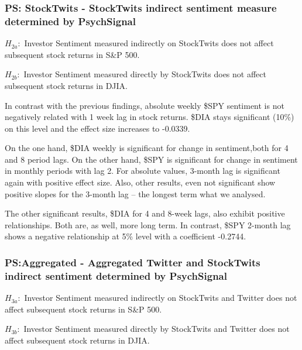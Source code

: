 

\subsubsection{PS: StockTwits - StockTwits indirect sentiment measure determined by PsychSignal}

\begin{center}

\itshape{
$H_{2a}:$ Investor Sentiment measured indirectly on StockTwits does not affect subsequent stock returns in S\&P 500.

$H_{2b}:$ Investor Sentiment measured directly by StockTwits does not affect subsequent stock returns in DJIA.
}

\end{center}

In contrast with the previous findings, absolute weekly \$SPY sentiment is not negatively related with 1 week lag in stock returns. \$DIA stays significant (10\%) on this level and the effect size increases to -0.0339.
\par
On the one hand, \$DIA weekly is significant for change in sentiment,both for 4 and 8 period lags. On the other hand, \$SPY is significant for change in sentiment in monthly periods with lag 2. For absolute values, 3-month lag is significant again with positive effect size. Also, other results, even not significant show positive slopes for the 3-month lag – the longest term what we analysed.
\par
The other significant results, \$DIA for 4 and 8-week lags, also exhibit positive relationships. Both are, as well, more long term. In contrast, \$SPY 2-month lag shows a negative relationship at 5\% level with a coefficient -0.2744.



\subsubsection{PS:Aggregated - Aggregated Twitter and StockTwits indirect sentiment determined by PsychSignal}

\begin{center}

\itshape {
$H_{3a}:$ Investor Sentiment measured indirectly on StockTwits and Twitter does not affect subsequent stock returns in S\&P 500.

$H_{3b}:$ Investor Sentiment measured directly by StockTwits and Twitter does not affect subsequent stock returns in DJIA.
}

\end{center}

